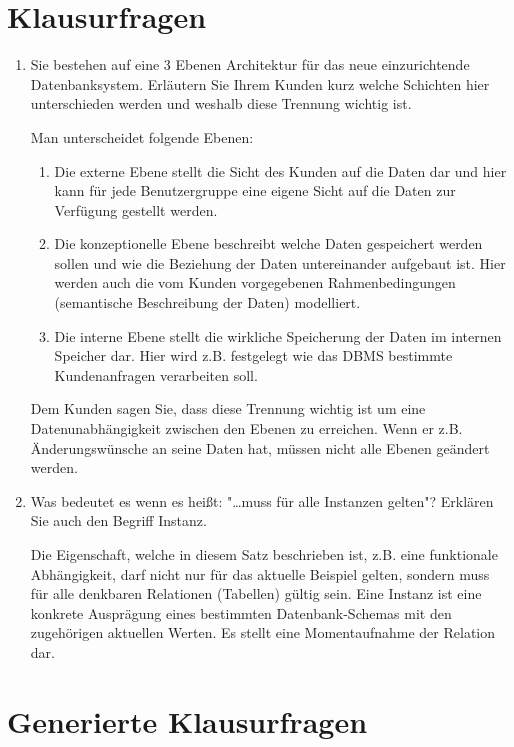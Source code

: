 \documentclass[a4paper]{article}
\begin{document}
\newpage
\section*{Klausurfragen}

\begin{enumerate}
    \item Sie bestehen auf eine 3 Ebenen Architektur für das neue einzurichtende Datenbanksystem.
    Erläutern Sie Ihrem Kunden kurz welche Schichten hier unterschieden werden und weshalb diese Trennung wichtig ist.

    Man unterscheidet folgende Ebenen:

    \begin{enumerate}
        \item Die externe Ebene stellt die Sicht des Kunden auf die Daten dar und hier kann für jede Benutzergruppe eine eigene Sicht auf die Daten zur Verfügung gestellt werden.
        \item Die konzeptionelle Ebene beschreibt welche Daten gespeichert werden sollen und wie die Beziehung der Daten untereinander aufgebaut ist. Hier werden auch die vom Kunden vorgegebenen Rahmenbedingungen (semantische Beschreibung der Daten) modelliert.
        \item Die interne Ebene stellt die wirkliche Speicherung der Daten im internen Speicher dar. Hier wird z.B. festgelegt wie das DBMS bestimmte Kundenanfragen verarbeiten soll.
    \end{enumerate}

    Dem Kunden sagen Sie, dass diese Trennung wichtig ist um eine Datenunabhängigkeit zwischen den Ebenen zu erreichen. Wenn er z.B. Änderungswünsche an seine Daten hat, müssen nicht alle Ebenen geändert werden.
    \item Was bedeutet es wenn es heißt: "…muss für alle Instanzen gelten"? Erklären Sie auch den Begriff Instanz.
    
    Die Eigenschaft, welche in diesem Satz beschrieben ist, z.B. eine funktionale Abhängigkeit, darf nicht nur für das aktuelle Beispiel gelten, sondern muss für alle denkbaren Relationen (Tabellen) gültig sein. Eine Instanz ist eine konkrete Ausprägung eines bestimmten Datenbank-Schemas mit den zugehörigen aktuellen Werten. Es stellt eine Momentaufnahme der Relation dar.
\end{enumerate}

\newpage
\section*{Generierte Klausurfragen}
\end{document}
